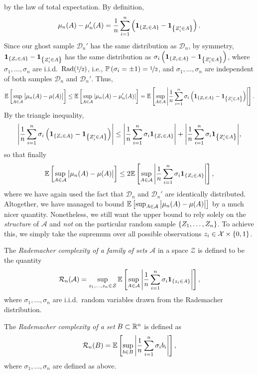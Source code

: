 by the law of total expectation. By definition,
\[
    \mu_n(A) - \mu_n'(A) = \frac{1}{n} \sum_{i=1}^n \left(\indSet{Z_i \in A} - \indSet{Z_i' \in A}\right).
\]
Since our ghost sample $\mathcal{D}_n'$ has the same distribution as $\mathcal{D}_n$, by symmetry, $\indSet{Z_i \in A} - \indSet{Z_i' \in A}$ has the same distribution as $\sigma_i \left(\indSet{Z_i \in A} - \indSet{Z_i' \in A}\right)$, where $\sigma_1, \dots, \sigma_n$ are i.i.d.\ $\mathrm{Rad}(\nicefrac{1}{2})$, i.e., $\Pr{\sigma_i = \pm 1} = \nicefrac{1}{2}$, and $\sigma_1, \dots, \sigma_n$ are independent of both samples $\mathcal{D}_n$ and $\mathcal{D}_n'$. Thus,
\[
    \Ex{\sup_{A \in \mathcal{A}} \bigAbs{ \mu_n(A) - \mu(A) }} \leq \Ex{\sup_{A \in \mathcal{A}} \abs{ \mu_n(A) - \mu_n'(A) }} = \Ex{\sup_{A \in \mathcal{A}} \abs{ \frac{1}{n} \sum_{i=1}^n \sigma_i \left(\indSet{Z_i \in A} - \indSet{Z_i' \in A}\right) }}.
\]
By the triangle inequality,
\[
    \abs{ \frac{1}{n} \sum_{i=1}^n \sigma_i \left(\indSet{Z_i \in A} - \indSet{Z_i' \in A}\right) } \leq \abs{ \frac{1}{n} \sum_{i=1}^n \sigma_i \indSet{Z_i \in A} } + \abs{ \frac{1}{n} \sum_{i=1}^n \sigma_i \indSet{Z_i' \in A} },
\]
so that finally
\begin{equation}
\label{eq: precursor to symmetrization bound}
    \Ex{\sup_{A \in \mathcal{A}} \bigAbs{ \mu_n(A) - \mu(A) }} \leq 2 \Ex{\sup_{A \in \mathcal{A}} \abs{ \frac{1}{n} \sum_{i=1}^n \sigma_i \indSet{Z_i \in A}}},
\end{equation}
where we have again used the fact that $\mathcal{D}_n$ and $\mathcal{D}_n'$ are identically distributed. Altogether, we have managed to bound $\Ex{\sup_{A \in \mathcal{A}} \bigAbs{ \mu_n(A) - \mu(A) }}$ by a much nicer quantity. Nonetheless, we still want the upper bound to rely solely on the \emph{structure} of $\mathcal{A}$ and \emph{not} on the particular random sample $\set{Z_1, \dots, Z_n}$. To achieve this, we simply take the supremum over all possible observations $z_i \in \mathcal{X} \times \set{0, 1}$.

\begin{definition}
The \emph{Rademacher complexity of a family of sets} $\mathcal{A}$ in a space $\mathcal{Z}$ is defined to be the quantity
\[
    \mathcal{R}_n(\mathcal{A}) = \sup_{z_1, \dots, z_n \in \mathcal{Z}} \Ex{\sup_{A \in \mathcal{A}} \abs{ \frac{1}{n} \sum_{i=1}^n \sigma_i \indSet{z_i \in A}}},
\]
where $\sigma_1, \dots, \sigma_n$ are i.i.d.\ random variables drawn from the Rademacher distribution.

The \emph{Rademacher complexity of a set} $B \subset \R^n$ is defined as 
\[
    \mathcal{R}_n(B) = \Ex{\sup_{b \in B} \abs{ \frac{1}{n} \sum_{i=1}^n \sigma_i b_i}},
\]
where $\sigma_1, \dots, \sigma_n$ are defined as above.
\end{definition}

